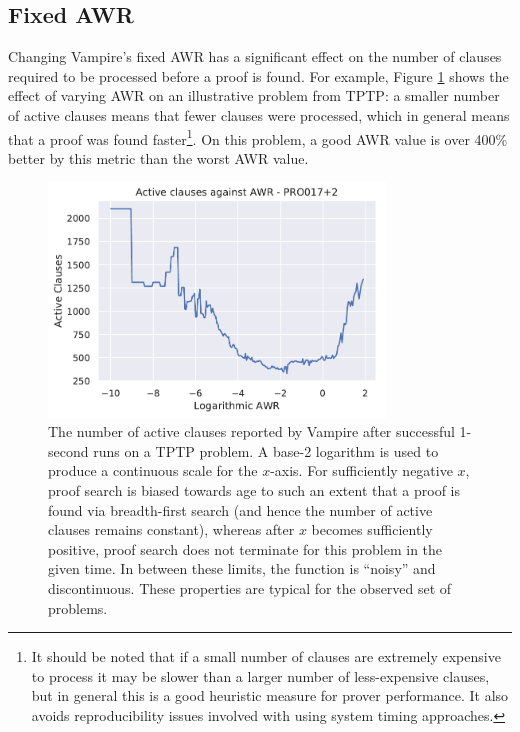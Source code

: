 \documentclass{llncs}
\begin{document}
\subsection{Fixed AWR}
Changing Vampire's fixed AWR has a significant effect on the number of clauses required to be processed before a proof is found.
For example, Figure \ref{fig:example-optimal-awr} shows the effect of varying AWR on an illustrative problem from TPTP: a smaller number of active clauses means that fewer clauses were processed, which in general means that a proof was found faster\footnote{
It should be noted that if a small number of clauses are extremely expensive to process it may be slower than a larger number of less-expensive clauses, but in general this is a good heuristic measure for prover performance.
It also avoids reproducibility issues involved with using system timing approaches.
}.
On this problem, a good AWR value is over 400\% better by this metric than the worst AWR value.

\begin{figure}
	\centering
	\includegraphics[width=0.8\textwidth]{example-optimal-awr}
	\caption{
The number of active clauses reported by Vampire after successful 1-second runs on a TPTP problem.
A base-2 logarithm is used to produce a continuous scale for the \(x\)-axis.
For sufficiently negative \(x\), proof search is biased towards age to such an extent that a proof is found via breadth-first search (and hence the number of active clauses remains constant), whereas after \(x\) becomes sufficiently positive, proof search does not terminate for this problem in the given time.
In between these limits, the function is ``noisy'' and discontinuous.
These properties are typical for the observed set of problems.
}
	\label{fig:example-optimal-awr}
\end{figure}
\end{document}

